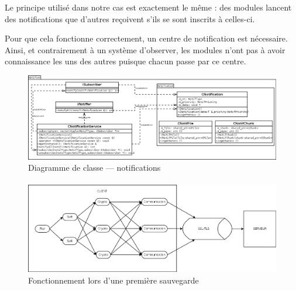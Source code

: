 \documentclass[a4paper,10pt, twoside]{report}
\begin{document}
\begin{spacing}{1.2}
Le principe utilis\'e dans notre cas est exactement le m\^eme : des modules
lancent des notifications que d'autres re\c{c}oivent s'ils se sont inscrits \`a
celles-ci.

Pour que cela fonctionne correctement, un centre de notification est
n\'ecessaire. Ainsi, et contrairement \`a un syst\`eme d'\flqq observer\frqq,
les modules n'ont pas \`a avoir connaissance les uns des autres puisque chacun
passe par ce centre.

\begin{figure}[h!]
  \hspace{-4.5em}
  \includegraphics[width=19cm]{softwareDesign/classDiagramNotif.png}
  \caption{\label{classDiagramNotif} Diagramme de classe --- notifications}
\end{figure}

\paragraph{}
\begin{figure}[h!]
  \hspace{-1.5em}
  \includegraphics[width=17cm]{softwareDesign/moduleInteraction.png}
  \caption{\label{interactModule} Fonctionnement lors d'une premi\`ere
  sauvegarde}
\end{figure}


\end{spacing}
\end{document}
